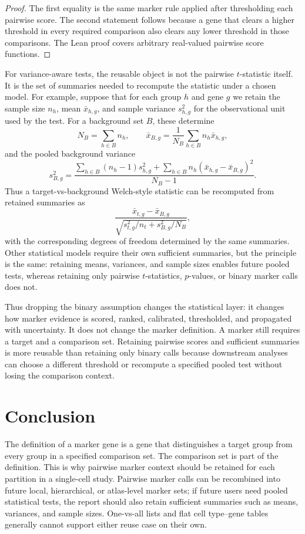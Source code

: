 \documentclass{article}
\begin{document}
\begin{proof}
The first equality is the same marker rule applied after thresholding each pairwise score. The second statement follows because a gene that clears a higher threshold in every required comparison also clears any lower threshold in those comparisons. The Lean proof covers arbitrary real-valued pairwise score functions.
\end{proof}

For variance-aware tests, the reusable object is not the pairwise $t$-statistic itself. It is the set of summaries needed to recompute the statistic under a chosen model. For example, suppose that for each group $h$ and gene $g$ we retain the sample size $n_h$, mean $\bar{x}_{h,g}$, and sample variance $s^2_{h,g}$ for the observational unit used by the test. For a background set $B$, these determine
\[
  N_B=\sum_{h\in B}n_h,\qquad
  \bar{x}_{B,g}=\frac{1}{N_B}\sum_{h\in B} n_h\bar{x}_{h,g},
\]
and the pooled background variance
\[
  s^2_{B,g}
  =
  \frac{
    \sum_{h\in B}(n_h-1)s^2_{h,g}
    +
    \sum_{h\in B}n_h(\bar{x}_{h,g}-\bar{x}_{B,g})^2
  }{N_B-1}.
\]
Thus a target-vs-background Welch-style statistic can be recomputed from retained summaries as
\[
  \frac{\bar{x}_{t,g}-\bar{x}_{B,g}}
       {\sqrt{s^2_{t,g}/n_t+s^2_{B,g}/N_B}},
\]
with the corresponding degrees of freedom determined by the same summaries. Other statistical models require their own sufficient summaries, but the principle is the same: retaining means, variances, and sample sizes enables future pooled tests, whereas retaining only pairwise $t$-statistics, $p$-values, or binary marker calls does not.

Thus dropping the binary assumption changes the statistical layer: it changes how marker evidence is scored, ranked, calibrated, thresholded, and propagated with uncertainty. It does not change the marker definition. A marker still requires a target and a comparison set. Retaining pairwise scores and sufficient summaries is more reusable than retaining only binary calls because downstream analyses can choose a different threshold or recompute a specified pooled test without losing the comparison context.

\section{Conclusion}

The definition of a marker gene is a gene that distinguishes a target group from every group in a specified comparison set. The comparison set is part of the definition. This is why pairwise marker context should be retained for each partition in a single-cell study. Pairwise marker calls can be recombined into future local, hierarchical, or atlas-level marker sets; if future users need pooled statistical tests, the report should also retain sufficient summaries such as means, variances, and sample sizes. One-vs-all lists and flat cell type--gene tables generally cannot support either reuse case on their own.

\newpage


\end{document}
